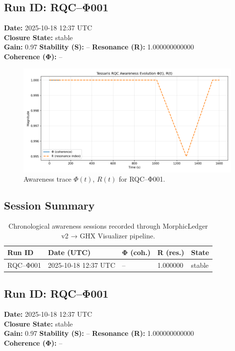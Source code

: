 \subsection*{Run ID: RQC–Φ001}
\textbf{Date:} 2025-10-18 12:37 UTC\\
\textbf{Closure State:} stable\\
\textbf{Gain:} 0.97 \quad
\textbf{Stability (S):} -- \quad
\textbf{Resonance (R):} 1.000000000000 \\
\textbf{Coherence (Φ):} --\\

\begin{figure}[H]
\centering
\includegraphics[width=0.95\linewidth]{data/visualizations/awareness_sessions/awareness_20251018_123845.png}
\caption{Awareness trace $\Phi(t)$, $R(t)$ for RQC–Φ001.}
\end{figure}
\subsection*{Session Summary}
\begin{table}[H]
\centering
\begin{tabular}{lllll}
\toprule
Run ID & Date (UTC) & Φ (coh.) & R (res.) & State \\
\midrule
RQC–Φ001 & 2025-10-18 12:37 UTC & -- & 1.000000 & stable \\
\bottomrule
\end{tabular}
\caption{Chronological awareness sessions recorded through MorphicLedger v2 → GHX Visualizer pipeline.}
\end{table}

\subsection*{Run ID: RQC–Φ001}
\textbf{Date:} 2025-10-18 12:37 UTC\\
\textbf{Closure State:} stable\\
\textbf{Gain:} 0.97 \quad
\textbf{Stability (S):} -- \quad
\textbf{Resonance (R):} 1.000000000000 \\
\textbf{Coherence (Φ):} --\\

